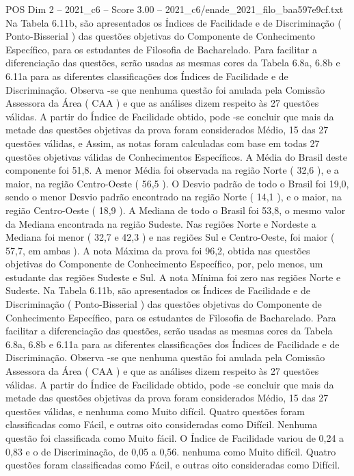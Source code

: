 \begin{textsample}{POS Dim 2 – 2021\_c6 – Score 3.00 – 2021\_c6/enade\_2021\_filo\_baa597e9cf.txt}
Na Tabela 6.11b, são apresentados os Índices de Facilidade e de Discriminação ( Ponto-Bisserial ) das questões objetivas do Componente de Conhecimento Específico, para os estudantes de Filosofia de Bacharelado.
Para facilitar a diferenciação das questões, serão usadas as mesmas cores da Tabela 6.8a, 6.8b e 6.11a para as diferentes classificações dos Índices de Facilidade e de Discriminação.
Observa -se que nenhuma questão foi anulada pela Comissão Assessora da Área ( CAA ) e que as análises dizem respeito às 27 questões válidas.
A partir do Índice de Facilidade obtido, pode -se concluir que mais da metade das questões objetivas da prova foram considerados Médio, 15 das 27 questões válidas, e Assim, as notas foram calculadas com base em todas 27 questões objetivas válidas de Conhecimentos Específicos.
A Média do Brasil deste componente foi 51,8.
A menor Média foi observada na região Norte ( 32,6 ), e a maior, na região Centro-Oeste ( 56,5 ).
O Desvio padrão de todo o Brasil foi 19,0, sendo o menor Desvio padrão encontrado na região Norte ( 14,1 ), e o maior, na região Centro-Oeste ( 18,9 ).
A Mediana de todo o Brasil foi 53,8, o mesmo valor da Mediana encontrada na região Sudeste.
Nas regiões Norte e Nordeste a Mediana foi menor ( 32,7 e 42,3 ) e nas regiões Sul e Centro-Oeste, foi maior ( 57,7, em ambas ).
A nota Máxima da prova foi 96,2, obtida nas questões objetivas do Componente de Conhecimento Específico, por, pelo menos, um estudante das regiões Sudeste e Sul.
A nota Mínima foi zero nas regiões Norte e Sudeste.
Na Tabela 6.11b, são apresentados os Índices de Facilidade e de Discriminação ( Ponto-Bisserial ) das questões objetivas do Componente de Conhecimento Específico, para os estudantes de Filosofia de Bacharelado.
Para facilitar a diferenciação das questões, serão usadas as mesmas cores da Tabela 6.8a, 6.8b e 6.11a para as diferentes classificações dos Índices de Facilidade e de Discriminação.
Observa -se que nenhuma questão foi anulada pela Comissão Assessora da Área ( CAA ) e que as análises dizem respeito às 27 questões válidas.
A partir do Índice de Facilidade obtido, pode -se concluir que mais da metade das questões objetivas da prova foram considerados Médio, 15 das 27 questões válidas, e nenhuma como Muito difícil.
Quatro questões foram classificadas como Fácil, e outras oito consideradas como Difícil.
Nenhuma questão foi classificada como Muito fácil.
O Índice de Facilidade variou de 0,24 a 0,83 e o de Discriminação, de 0,05 a 0,56. nenhuma como Muito difícil.
Quatro questões foram classificadas como Fácil, e outras oito consideradas como Difícil.

\end{textsample}
